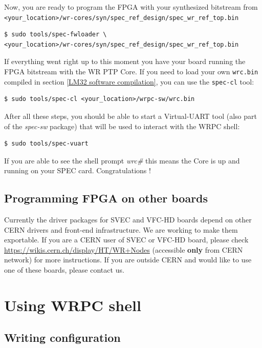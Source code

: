 \documentclass[a4paper, 12pt]{article}
\begin{document}
Now, you are ready to program the FPGA with your synthesized bitstream from
\texttt{<your\_location>/wr-cores/syn/spec\_ref\_design/spec\_wr\_ref\_top.bin}
\begin{lstlisting}
$ sudo tools/spec-fwloader \
<your_location>/wr-cores/syn/spec_ref_design/spec_wr_ref_top.bin
\end{lstlisting}

If everything went right up to this moment you have your board running the FPGA 
bitstream with the WR PTP Core. If you need to load your own \texttt{wrc.bin}
compiled in section \ref{LM32 software compilation}, you can use the
\texttt{spec-cl} tool:
\begin{lstlisting}
$ sudo tools/spec-cl <your_location>/wrpc-sw/wrc.bin
\end{lstlisting}

After all these steps, you should be able to start a Virtual-UART tool (also
part of the \textit{spec-sw} package) that will be used to interact with the
WRPC shell:
\begin{lstlisting}
$ sudo tools/spec-vuart
\end{lstlisting}

If you are able to see the shell prompt \textit{wrc\#} this means the Core
is up and running on your SPEC card. Congratulations !

\subsection{Programming FPGA on other boards}

Currently the driver packages for SVEC and VFC-HD boards depend on other CERN
drivers and front-end infrastructure. We are working to make them exportable. If
you are a CERN user of SVEC or VFC-HD board, please check
\url{https://wikis.cern.ch/display/HT/WR+Nodes} (accessible \textbf{only} from
CERN network) for more instructions. If you are outside CERN and would like to
use one of these boards, please contact us.

\section{Using WRPC shell}

\subsection{Writing configuration}
\label{Writing configuration}
\end{document}
